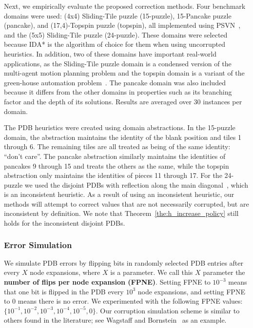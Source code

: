 \documentclass[letterpaper]{article}
\begin{document}
Next, we empirically evaluate the proposed correction methods. %
Four benchmark domains were used: (4x4) Sliding-Tile puzzle (15-puzzle), 15-Pancake puzzle (pancake), and (17,4)-Topspin puzzle (topspin), all implemented using PSVN~\cite{psvn}, and the (5x5) Sliding-Tile puzzle (24-puzzle). %
These domains were selected because IDA* is the algorithm of choice for them when using uncorrupted heuristics. In addition, two of these domains have important real-world applications, as the Sliding-Tile puzzle domain is a condensed version of the multi-agent motion planning problem and the topspin domain is a variant of the green-house automation problem~\cite{HelmertL10}. The pancake domain was also included because it differs from the other domains in properties such as its branching factor and the depth of its solutions. Results are averaged over 30 instances per domain.




The PDB heuristics were created using domain abstractions. In the 15-puzzle domain, the abstraction maintains the identity of the blank position and tiles 1 through 6. The remaining tiles are all treated as being of the same identity: ``don't care''. The pancake abstraction similarly maintains the identities of pancakes 9 through 15 and treats the others as the same, while the topspin abstraction only maintains the identities of pieces 11 through 17.
For the 24-puzzle we used the disjoint PDBs with reflection along the main diagonal~\cite{korf2002disjointPatternDatabase}, which is an inconsistent heuristic. As a result of using an inconsistent heuristic, our methods will attempt to correct values that are not necessarily corrupted, but are inconsistent by definition. We note that Theorem~\ref{the:h_increase_policy} still holds for the inconsistent disjoint PDBs.



\subsubsection{Error Simulation}


We simulate PDB errors by flipping bits in randomly selected PDB entries after every $X$ node expansions, where $X$ is a parameter. We call this $X$ parameter the \textbf{number of flips per node expansion (FPNE)}. Setting FPNE to $10^{-3}$ means that one bit is flipped in the PDB every $10^{3}$ node expansions, and setting FPNE to $0$ means there is no error. We experimented with the following FPNE values: $\{10^{-1},10^{-2}, 10^{-3}, 10^{-4}, 10^{-5}, 0\}$. Our corruption simulation scheme is similar to others found in the literature; see Wagstaff and Bornstein~ as an example.
\end{document}

